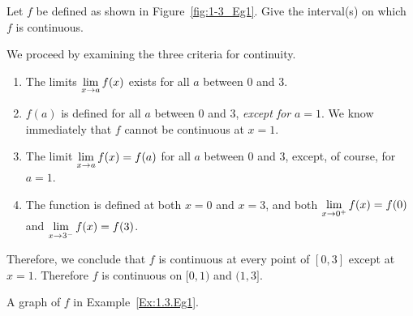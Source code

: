 \begin{example}\label{Ex:1.3.Eg1} %
Let $f$ be defined as shown in Figure~\ref{fig:1-3_Eg1}. Give the interval(s) on which $f$ is continuous.

\solution We proceed by examining the three criteria for continuity.
\begin{enumerate}[1)]
\item The limits $\displaystyle \lim_{x \to a} f(x)$ exists for all $a$ between $0$ and $3$.
\item $f(a)$ is defined for all $a$ between $0$ and $3$, \textit{except for} $a=1$. We know immediately that $f$ cannot be continuous at $x=1$.
\item The limit $\displaystyle \lim_{x \to a} f(x) = f(a)$ for all $a$ between $0$ and $3$, except, of course, for $a=1$. 
\item The function is defined at both $x = 0$ and $x = 3$, and both $\displaystyle\lim_{x \to 0^+} f(x) = f(0)$ and $\displaystyle\lim_{x \to 3^-} f(x) = f(3)$.
\end{enumerate}

Therefore, we conclude that $f$ is continuous at every point of $[0,3]$ except at $x=1$. Therefore $f$ is continuous on $[0,1)$ and $(1,3]$.
\end{example}

\begin{marginfigure}[-8cm]
\caption{A graph of $f$ in Example~\ref{Ex:1.3.Eg1}.}\label{fig:1-3_Eg1}
\end{marginfigure}